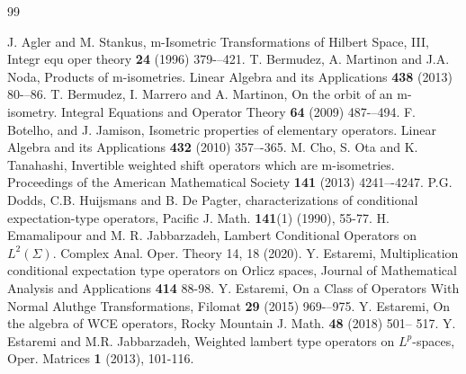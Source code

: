 \documentclass{amsart}
\theoremstyle{definition}\newtheorem{defn}[thm]{Definition}
\theoremstyle{remark}
\numberwithin{equation}{section}
\begin{document}
\begin{thebibliography}{99}

 J. Agler and M. Stankus, m-Isometric Transformations of Hilbert Space, III, Integr equ oper theory {\bf 24} (1996) 379-–421.
 T. Bermudez, A. Martinon and J.A. Noda, Products of m-isometries. Linear Algebra and its Applications {\bf 438} (2013) 80-–86.
 T. Bermudez, I. Marrero and A. Martinon, On the orbit of an m-isometry. Integral Equations and Operator Theory {\bf 64} (2009) 487-–494.
 F. Botelho, and J. Jamison,  Isometric properties of elementary operators. Linear Algebra and its Applications {\bf 432} (2010) 357–-365.
 M. Cho, S. Ota and K. Tanahashi, Invertible weighted shift operators which are m-isometries.
Proceedings of the American Mathematical Society {\bf141} (2013) 4241–-4247.
 P.G. Dodds, C.B. Huijsmans and B. De Pagter,
characterizations of conditional expectation-type operators,
Pacific J. Math. {\bf 141}(1) (1990), 55-77.
 H. Emamalipour and M. R. Jabbarzadeh, Lambert Conditional Operators on $L^2(\Sigma)$. Complex Anal. Oper. Theory 14, 18 (2020).
 Y. Estaremi, Multiplication conditional expectation type operators on Orlicz spaces, Journal of Mathematical Analysis and Applications {\bf414} 88-98.
 Y. Estaremi, On a Class of Operators With Normal Aluthge Transformations, Filomat {\bf 29} (2015) 969-–975.
 Y. Estaremi, On the algebra of WCE operators, Rocky Mountain J. Math. {\bf 48} (2018) 501-- 517.
 Y. Estaremi and M.R. Jabbarzadeh, Weighted lambert type operators on
$L^{p}$-spaces, Oper. Matrices {\bf 1} (2013), 101-116.

\end{thebibliography}
\end{document}
